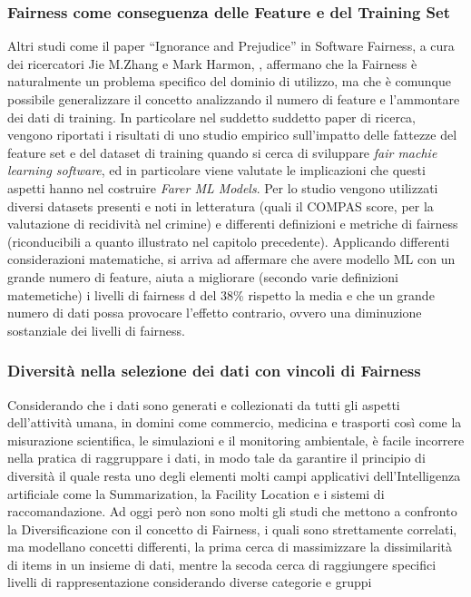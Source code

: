 \subsubsection{Fairness come conseguenza delle Feature e del Training Set}
Altri studi come il paper  “Ignorance and Prejudice” in Software Fairness, a cura dei ricercatori  Jie M.Zhang e Mark Harmon, \cite{Ignorance&Prejudice}, affermano che la Fairness è naturalmente un problema specifico del dominio di utilizzo, ma che è comunque possibile generalizzare il concetto analizzando il numero di feature e l'ammontare dei dati di training. In particolare nel suddetto suddetto paper di ricerca, vengono riportati i risultati di uno studio empirico sull'impatto delle fattezze del  feature set e del dataset di training quando si cerca di sviluppare \textit{fair machie learning software}, ed in particolare viene valutate le implicazioni che questi aspetti hanno nel costruire \textit{Farer ML Models}. Per lo studio vengono utilizzati diversi datasets presenti e noti in letteratura (quali il COMPAS score, per la valutazione di recidività nel crimine) e differenti definizioni e metriche di fairness (riconducibili a quanto illustrato nel capitolo precedente). Applicando differenti considerazioni matematiche, si arriva ad affermare che avere modello ML con un grande numero di feature, aiuta a migliorare (secondo varie definizioni matemetiche) i livelli di fairness d del 38\% rispetto la media e che un grande numero di dati possa provocare l'effetto contrario, ovvero una diminuzione sostanziale dei livelli di fairness.

\subsubsection{Diversità nella selezione dei dati con vincoli di Fairness}
Considerando che i dati sono generati e collezionati da tutti gli aspetti dell'attività umana, in domini come commercio, medicina e trasporti così come la misurazione scientifica, le simulazioni e il monitoring ambientale, è facile incorrere nella pratica di raggruppare i dati, in modo tale da garantire il principio di diversità il quale resta uno degli elementi molti campi applicativi dell'Intelligenza artificiale come la Summarization, la Facility Location e i sistemi di raccomandazione. Ad oggi però non sono molti gli studi che mettono a confronto la Diversificazione con il concetto di Fairness, i quali sono strettamente correlati, ma modellano concetti differenti, la prima cerca di massimizzare la dissimilarità di items in un insieme di dati, mentre la secoda cerca di raggiungere specifici livelli di rappresentazione considerando diverse categorie e gruppi \cite{FairnessDefinitionExplained}


